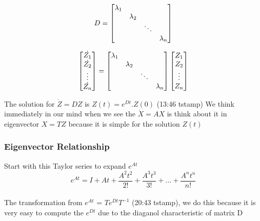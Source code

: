 \documentclass{article}
\begin{document}
\begin{equation} 
  D = 
  \begin{bmatrix}
        $$\lambda_{1}$$ &  &  &\\ 
        & $$\lambda_{2}$$   &  &\\ 
        & & \ddots & \\ 
        & & & $$\lambda_{n}$$
  \end{bmatrix}
\end{equation}

\begin{equation}     
  \begin{bmatrix}
    $$\dot{Z_1}$$\\ 
    $$\dot{Z_2}$$\\ 
    \vdots\\
    $$\dot{Z_n}$$ 
  \end{bmatrix}
  =
  \begin{bmatrix}
    $$\lambda_{1}$$ &  &  &\\ 
    & $$\lambda_{2}$$   &  &\\ 
    & & \ddots & \\ 
    & & & $$\lambda_{n}$$
  \end{bmatrix}
  \begin{bmatrix}
    $$Z_1$$\\ 
    $$Z_2$$\\ 
    \vdots\\
    $$Z_n$$ 
  \end{bmatrix}
\end{equation}

The solution for $\dot{Z} = DZ$  is $Z(t) = e^{Dt}.Z(0)$ (13:46 tstamp)
We think immediately in our mind 
when we see the $\dot{X} = AX$
is think about it in eigenvector $X = TZ$
because it is simple for the solution $Z(t)$




\subsubsection{Eigenvector Relationship}
Start with this Taylor series to expand $e^{At}$
\begin{equation}
  e^{At} = I + At + \frac{ A^{2}t^{2} }{2!} + \frac{ A^{3}t^{3} }{3!} + \ldots + \frac{ A^{n}t^{n} }{n!}
\end{equation}
\\The transformation from $e^{At}$ = $Te^{Dt}T^{-1}$ (20:43 tstamp), 
we do this because it is very easy to compute the $e^{Dt}$ due to the diaganol characteristic of matrix D
\end{document}
